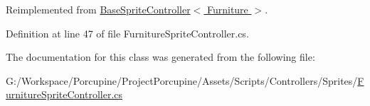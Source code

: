 Reimplemented from \hyperlink{class_base_sprite_controller_ae1fdf8c0abb1e362257540f2de80d6dc}{Base\+Sprite\+Controller$<$ Furniture $>$}.



Definition at line 47 of file Furniture\+Sprite\+Controller.\+cs.



The documentation for this class was generated from the following file\+:\begin{DoxyCompactItemize}
\item 
G\+:/\+Workspace/\+Porcupine/\+Project\+Porcupine/\+Assets/\+Scripts/\+Controllers/\+Sprites/\hyperlink{_furniture_sprite_controller_8cs}{Furniture\+Sprite\+Controller.\+cs}\end{DoxyCompactItemize}
